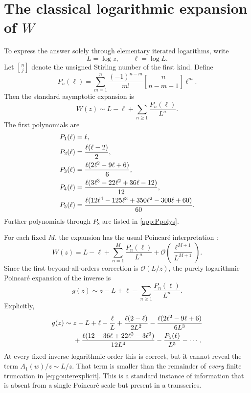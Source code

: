 \documentclass[11pt]{article}
\theoremstyle{clean}
\newcommand{\bigO}{\mathcal O}
\newcommand{\bracks}[2]{\genfrac{[}{]}{0pt}{}{#1}{#2}}
\begin{document}
\section{The classical logarithmic expansion of \texorpdfstring{\(W\)}{W}}

To express the answer solely through elementary iterated logarithms, write
\[
  L=\log z,
  \qquad
  \ell=\log L.
\]
Let \(\bracks{n}{j}\) denote the unsigned Stirling number of the first kind.
Define
\begin{equation}\label{eq:Pndef}
  P_n(\ell)=\sum_{m=1}^{n}
  \frac{(-1)^{n-m}}{m!}
  \bracks{n}{n-m+1}\ell^m.
\end{equation}
Then the standard asymptotic expansion \cite{Corless1996,DLMF} is
\begin{equation}\label{eq:Wlogseries}
  W(z)\sim L-\ell+\sum_{n\ge1}\frac{P_n(\ell)}{L^n}.
\end{equation}
The first polynomials are
\begin{align}
 P_1(\ell)&=\ell,\notag\\
 P_2(\ell)&=\frac{\ell(\ell-2)}2,\notag\\
 P_3(\ell)&=\frac{\ell(2\ell^2-9\ell+6)}6,\notag\\
 P_4(\ell)&=\frac{\ell(3\ell^3-22\ell^2+36\ell-12)}{12},\notag\\
 P_5(\ell)&=\frac{\ell(12\ell^4-125\ell^3+350\ell^2-300\ell+60)}{60}.
 \label{eq:Pfirst}
\end{align}
Further polynomials through \(P_8\) are listed in \cref{app:Ppolys}.

For each fixed \(M\), the expansion has the usual Poincar\'e interpretation \cite{deBruijn}:
\begin{equation}\label{eq:Wlogremainder}
 W(z)=L-\ell+\sum_{n=1}^{M}\frac{P_n(\ell)}{L^n}
 +\bigO\!\left(\frac{\ell^{M+1}}{L^{M+1}}\right).
\end{equation}
Since the first beyond-all-orders correction is \(\bigO(L/z)\), the purely
logarithmic Poincar\'e expansion of the inverse is
\begin{equation}\label{eq:goutergeneral}
  g(z)\sim z-L+\ell-\sum_{n\ge1}\frac{P_n(\ell)}{L^n}.
\end{equation}
Explicitly,
\begin{align}
 g(z)\sim{}&z-L+\ell-\frac{\ell}{L}
 +\frac{\ell(2-\ell)}{2L^2}
 -\frac{\ell(2\ell^2-9\ell+6)}{6L^3}\notag\\
 &+\frac{\ell(12-36\ell+22\ell^2-3\ell^3)}{12L^4}
 -\frac{P_5(\ell)}{L^5}-\cdots.
 \label{eq:gouterexplicit}
\end{align}
At every fixed inverse-logarithmic order this is correct, but it cannot reveal
the term \(A_1(w)/z\sim L/z\).  That term is smaller than the remainder of
\emph{every} finite truncation in \cref{eq:gouterexplicit}.  This is a standard
instance of information that is absent from a single Poincar\'e scale but present
in a transseries.
\end{document}
